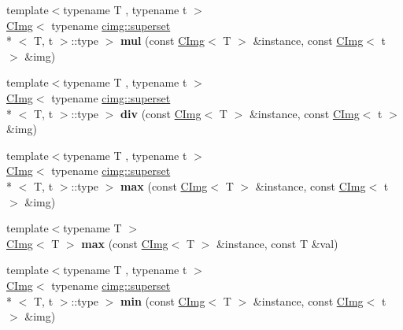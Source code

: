 \begin{DoxyCompactItemize}
\item 
\hypertarget{namespacecimg__library_a7acdf5b481ddbf5ba6ee59d3299be505}{{\footnotesize template$<$typename T , typename t $>$ }\\\hyperlink{structcimg__library_1_1_c_img}{C\-Img}$<$ typename \hyperlink{structcimg__library_1_1cimg_1_1superset}{cimg\-::superset}\\*
$<$ T, t $>$\-::type $>$ {\bfseries mul} (const \hyperlink{structcimg__library_1_1_c_img}{C\-Img}$<$ T $>$ \&instance, const \hyperlink{structcimg__library_1_1_c_img}{C\-Img}$<$ t $>$ \&img)}\label{namespacecimg__library_a7acdf5b481ddbf5ba6ee59d3299be505}

\item 
\hypertarget{namespacecimg__library_ad4a5c8aef33ae0edbecd99b888562c3e}{{\footnotesize template$<$typename T , typename t $>$ }\\\hyperlink{structcimg__library_1_1_c_img}{C\-Img}$<$ typename \hyperlink{structcimg__library_1_1cimg_1_1superset}{cimg\-::superset}\\*
$<$ T, t $>$\-::type $>$ {\bfseries div} (const \hyperlink{structcimg__library_1_1_c_img}{C\-Img}$<$ T $>$ \&instance, const \hyperlink{structcimg__library_1_1_c_img}{C\-Img}$<$ t $>$ \&img)}\label{namespacecimg__library_ad4a5c8aef33ae0edbecd99b888562c3e}

\item 
\hypertarget{namespacecimg__library_a23eaf6e0fe12d267f34332af5cf4c51d}{{\footnotesize template$<$typename T , typename t $>$ }\\\hyperlink{structcimg__library_1_1_c_img}{C\-Img}$<$ typename \hyperlink{structcimg__library_1_1cimg_1_1superset}{cimg\-::superset}\\*
$<$ T, t $>$\-::type $>$ {\bfseries max} (const \hyperlink{structcimg__library_1_1_c_img}{C\-Img}$<$ T $>$ \&instance, const \hyperlink{structcimg__library_1_1_c_img}{C\-Img}$<$ t $>$ \&img)}\label{namespacecimg__library_a23eaf6e0fe12d267f34332af5cf4c51d}

\item 
\hypertarget{namespacecimg__library_a54d83b09f0a9a5f1458bfd06f2ce0756}{{\footnotesize template$<$typename T $>$ }\\\hyperlink{structcimg__library_1_1_c_img}{C\-Img}$<$ T $>$ {\bfseries max} (const \hyperlink{structcimg__library_1_1_c_img}{C\-Img}$<$ T $>$ \&instance, const T \&val)}\label{namespacecimg__library_a54d83b09f0a9a5f1458bfd06f2ce0756}

\item 
\hypertarget{namespacecimg__library_a370263920fa5a11056d59a1a80150a3c}{{\footnotesize template$<$typename T , typename t $>$ }\\\hyperlink{structcimg__library_1_1_c_img}{C\-Img}$<$ typename \hyperlink{structcimg__library_1_1cimg_1_1superset}{cimg\-::superset}\\*
$<$ T, t $>$\-::type $>$ {\bfseries min} (const \hyperlink{structcimg__library_1_1_c_img}{C\-Img}$<$ T $>$ \&instance, const \hyperlink{structcimg__library_1_1_c_img}{C\-Img}$<$ t $>$ \&img)}\label{namespacecimg__library_a370263920fa5a11056d59a1a80150a3c}


\end{DoxyCompactItemize}
